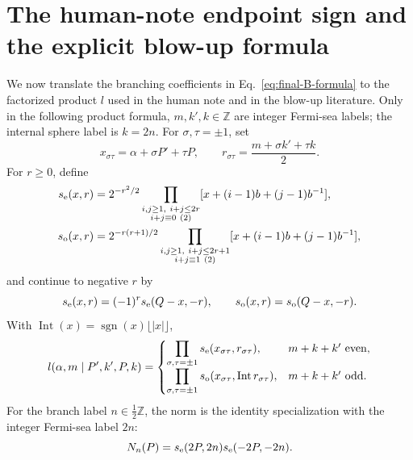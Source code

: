 \documentclass[11pt]{article}
\newcommand{\se}{s_{\rm e}}
\newcommand{\so}{s_{\rm o}}
\begin{document}
\section{The human-note endpoint sign and the explicit blow-up formula}

We now translate the branching coefficients in
Eq.~\eqref{eq:final-B-formula} to the factorized product \(l\) used in the
human note and in the blow-up literature.  Only in the following product
formula, \(m,k',k\in\mathbb Z\) are integer Fermi-sea labels; the internal
sphere label is \(k=2n\).  For \(\sigma,\tau=\pm1\), set
\begin{equation}
 x_{\sigma\tau}=\alpha+\sigma P'+\tau P,
 \qquad
 r_{\sigma\tau}=\frac{m+\sigma k'+\tau k}{2}.
 \label{eq:x-r}
\end{equation}
For \(r\ge0\), define
\begin{align}
 \se(x,r)
 &=2^{-r^2/2}
 \prod_{\substack{i,j\ge1,\ i+j\le2r\\i+j\equiv0\ (2)}}
 [x+(i-1)b+(j-1)b^{-1}],
 \nonumber\\
 \so(x,r)
 &=2^{-r(r+1)/2}
 \prod_{\substack{i,j\ge1,\ i+j\le2r+1\\i+j\equiv1\ (2)}}
 [x+(i-1)b+(j-1)b^{-1}],
 \label{eq:s-functions}
\end{align}
and continue to negative \(r\) by
\begin{equation}
 \se(x,r)=(-1)^r\se(Q-x,-r),
 \qquad
 \so(x,r)=\so(Q-x,-r).
 \label{eq:s-continuation}
\end{equation}
With \(\operatorname{Int}(x)=\operatorname{sgn}(x)\lfloor|x|\rfloor\),
\begin{equation}
 l(\alpha,m\mid P',k',P,k)
 =\begin{cases}
 \displaystyle\prod_{\sigma,\tau=\pm1}
 \se(x_{\sigma\tau},r_{\sigma\tau}),
 &m+k+k'\text{ even},\\[0.8em]
 \displaystyle\prod_{\sigma,\tau=\pm1}
 \so(x_{\sigma\tau},\operatorname{Int}r_{\sigma\tau}),
 &m+k+k'\text{ odd}.
 \end{cases}
 \label{eq:l-product}
\end{equation}
For the branch label \(n\in\frac12\mathbb Z\), the norm is the identity
specialization with the integer Fermi-sea label \(2n\):
\begin{equation}
 N_n(P)=\se(2P,2n)\se(-2P,-2n).
 \label{eq:branch-norm}
\end{equation}
\end{document}
